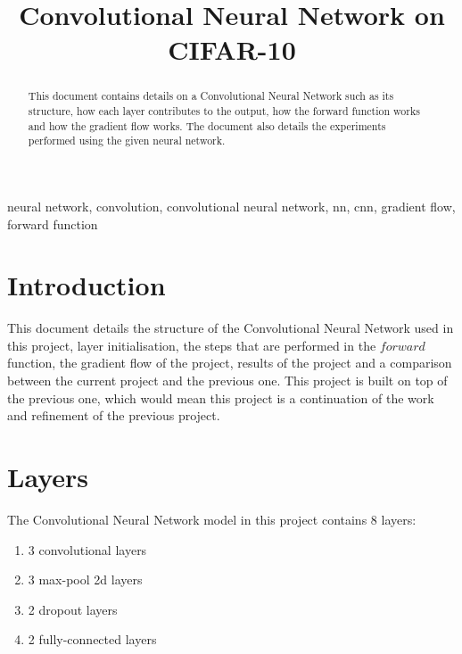 \documentclass[conference]{IEEEtran}
\begin{document}
\title{Convolutional Neural Network on CIFAR-10}

\author{
}

\maketitle


\begin{abstract}
This document contains details on a Convolutional Neural Network such as its structure, how each layer contributes to the
output, how the forward function works and how the gradient flow works. The document also details the experiments performed
using the given neural network.
\end{abstract}

\begin{IEEEkeywords}
neural network, convolution, convolutional neural network, nn, cnn, gradient flow, forward function
\end{IEEEkeywords}


\section{Introduction}
This document details the structure of the Convolutional Neural Network used in this project, layer initialisation, the steps
that are performed in the $forward$ function, the gradient flow of the project, results of the project and a comparison between
the current project and the previous one. This project is built on top of the previous one, which would mean this project
is a continuation of the work and refinement of the previous project.

\section{Layers}
The Convolutional Neural Network model in this project contains 8 layers:

\begin{enumerate}
    \item 3 convolutional layers
    \item 3 max-pool 2d layers
    \item 2 dropout layers
    \item 2 fully-connected layers
\end{enumerate}
\end{document}
